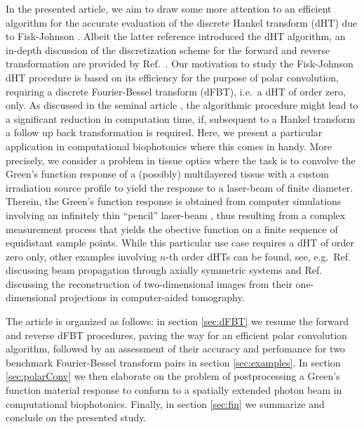 \documentclass[review]{elsarticle}
\begin{document}
In the presented article, we aim to draw some more attention to an efficient 
algorithm for the accurate evaluation of the discrete Hankel transform (dHT) 
due to Fisk-Johnson \cite{FiskJohnson:1987}. Albeit the latter reference
introduced the dHT algorithm, an in-depth discussion of the discretization 
scheme for the forward and reverse transformation are provided by 
Ref.~\cite{Baddour:2015}.
Our motivation to study the Fisk-Johnson dHT procedure is based on its
efficiency for the purpose of polar convolution, requiring a discrete
Fourier-Bessel transform (dFBT), i.e.\ a dHT of order zero, only. As discussed
in the seminal article \cite{FiskJohnson:1987}, the algorithmic procedure might
lead to a significant reduction in computation time, if, subsequent to a Hankel
transform a follow up back transformation is required.  Here, we present a
particular application in computational biophotonics where this comes in handy. 
More precisely, we consider a problem in tissue optics where the task is to
convolve the Green's function response of a (possibly) multilayered tissue 
with a custom irradiation source profile to yield the response to a laser-beam 
of finite diameter.
Therein, the Green's function response is obtained from computer simulations 
involving an infinitely thin ``pencil'' laser-beam \cite{MCML:1995}, thus 
resulting from a complex measurement process that yields the obective 
function on a finite sequence of equidistant sample points.
While this particular use case requires a dHT of order zero only, other
examples involving $n$-th order dHTs can be found, see, e.g.\ Ref.\
\cite{GuizarSicairos:2004} discussing beam propagation through axially
symmetric systems and Ref.\ \cite{Higgins:1988} discussing the reconstruction 
of two-dimensional images from their one-dimensional projections in 
computer-aided tomography.


The article is organized as follows: in section \ref{sec:dFBT} we resume the
forward and reverse dFBT procedures, paving the way for an efficient polar
convolution algorithm, followed by an assessment of their accuracy and
perfomance for two benchmark Fourier-Bessel transform pairs in section
\ref{sec:examples}. In section \ref{sec:polarConv} we then elaborate on the
problem of postprocessing a Green's function material response to conform to a
spatially extended photon beam in computational biophotonics.  Finally, in
section \ref{sec:fin} we summarize and conclude on the presented study.

\end{document}
